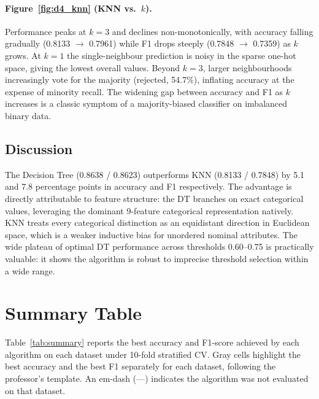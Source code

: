 \documentclass[11pt,letterpaper]{article}
\begin{document}
\paragraph{Figure~\ref{fig:d4_knn} (KNN vs.\ $k$).}
Performance peaks at $k=3$ and declines non-monotonically, with accuracy
falling gradually (0.8133 $\to$ 0.7961) while F1 drops steeply
(0.7848 $\to$ 0.7359) as $k$ grows.  At $k=1$ the single-neighbour
prediction is noisy in the sparse one-hot space, giving the lowest overall
values.  Beyond $k=3$, larger neighbourhoods increasingly vote for the
majority (rejected, 54.7\%), inflating accuracy at the expense of minority
recall.  The widening gap between accuracy and F1 as $k$ increases is a
classic symptom of a majority-biased classifier on imbalanced binary data.

\subsection{Discussion}

The Decision Tree (0.8638 / 0.8623) outperforms KNN (0.8133 / 0.7848) by
5.1 and 7.8 percentage points in accuracy and F1 respectively.  The
advantage is directly attributable to feature structure: the DT branches
on exact categorical values, leveraging the dominant 9-feature categorical
representation natively.  KNN treats every categorical distinction as an
equidistant direction in Euclidean space, which is a weaker inductive bias
for unordered nominal attributes.  The wide plateau of optimal DT performance
across thresholds 0.60--0.75 is practically valuable: it shows the algorithm
is robust to imprecise threshold selection within a wide range.

\section{Summary Table}

Table~\ref{tab:summary} reports the best accuracy and F1-score achieved by
each algorithm on each dataset under 10-fold stratified CV.  Gray cells
highlight the best accuracy and the best F1 separately for each dataset,
following the professor's template.  An em-dash (---) indicates the algorithm
was not evaluated on that dataset.
\end{document}
